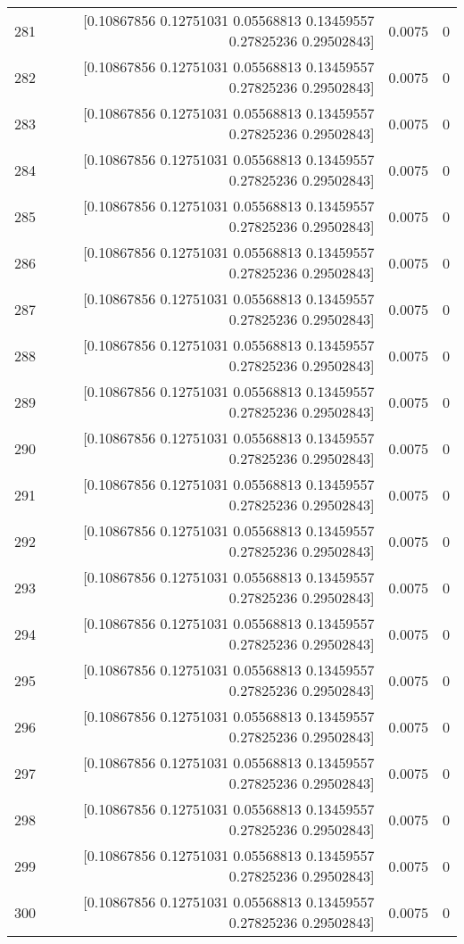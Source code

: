 \begin{longtable}{lrrr}
281 & [0.10867856 0.12751031 0.05568813 0.13459557 0.27825236 0.29502843] & 0.0075 & 0 \\
282 & [0.10867856 0.12751031 0.05568813 0.13459557 0.27825236 0.29502843] & 0.0075 & 0 \\
283 & [0.10867856 0.12751031 0.05568813 0.13459557 0.27825236 0.29502843] & 0.0075 & 0 \\
284 & [0.10867856 0.12751031 0.05568813 0.13459557 0.27825236 0.29502843] & 0.0075 & 0 \\
285 & [0.10867856 0.12751031 0.05568813 0.13459557 0.27825236 0.29502843] & 0.0075 & 0 \\
286 & [0.10867856 0.12751031 0.05568813 0.13459557 0.27825236 0.29502843] & 0.0075 & 0 \\
287 & [0.10867856 0.12751031 0.05568813 0.13459557 0.27825236 0.29502843] & 0.0075 & 0 \\
288 & [0.10867856 0.12751031 0.05568813 0.13459557 0.27825236 0.29502843] & 0.0075 & 0 \\
289 & [0.10867856 0.12751031 0.05568813 0.13459557 0.27825236 0.29502843] & 0.0075 & 0 \\
290 & [0.10867856 0.12751031 0.05568813 0.13459557 0.27825236 0.29502843] & 0.0075 & 0 \\
291 & [0.10867856 0.12751031 0.05568813 0.13459557 0.27825236 0.29502843] & 0.0075 & 0 \\
292 & [0.10867856 0.12751031 0.05568813 0.13459557 0.27825236 0.29502843] & 0.0075 & 0 \\
293 & [0.10867856 0.12751031 0.05568813 0.13459557 0.27825236 0.29502843] & 0.0075 & 0 \\
294 & [0.10867856 0.12751031 0.05568813 0.13459557 0.27825236 0.29502843] & 0.0075 & 0 \\
295 & [0.10867856 0.12751031 0.05568813 0.13459557 0.27825236 0.29502843] & 0.0075 & 0 \\
296 & [0.10867856 0.12751031 0.05568813 0.13459557 0.27825236 0.29502843] & 0.0075 & 0 \\
297 & [0.10867856 0.12751031 0.05568813 0.13459557 0.27825236 0.29502843] & 0.0075 & 0 \\
298 & [0.10867856 0.12751031 0.05568813 0.13459557 0.27825236 0.29502843] & 0.0075 & 0 \\
299 & [0.10867856 0.12751031 0.05568813 0.13459557 0.27825236 0.29502843] & 0.0075 & 0 \\
300 & [0.10867856 0.12751031 0.05568813 0.13459557 0.27825236 0.29502843] & 0.0075 & 0 \\

\end{longtable}
